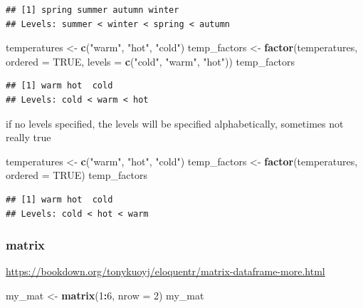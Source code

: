 \documentclass[
]{book}
\newenvironment{Shaded}{\begin{snugshade}}{\end{snugshade}}
\newcommand{\AttributeTok}[1]{\textcolor[rgb]{0.13,0.29,0.53}{#1}}
\newcommand{\ConstantTok}[1]{\textcolor[rgb]{0.56,0.35,0.01}{#1}}
\newcommand{\DecValTok}[1]{\textcolor[rgb]{0.00,0.00,0.81}{#1}}
\newcommand{\FunctionTok}[1]{\textcolor[rgb]{0.13,0.29,0.53}{\textbf{#1}}}
\newcommand{\NormalTok}[1]{#1}
\newcommand{\OtherTok}[1]{\textcolor[rgb]{0.56,0.35,0.01}{#1}}
\newcommand{\SpecialCharTok}[1]{\textcolor[rgb]{0.81,0.36,0.00}{\textbf{#1}}}
\newcommand{\StringTok}[1]{\textcolor[rgb]{0.31,0.60,0.02}{#1}}
\theoremstyle{definition}
\theoremstyle{definition}
\theoremstyle{definition}
\theoremstyle{definition}
\theoremstyle{remark}
\begin{document}
\begin{verbatim}
## [1] spring summer autumn winter
## Levels: summer < winter < spring < autumn
\end{verbatim}

\begin{Shaded}
\begin{Highlighting}[]
\NormalTok{temperatures }\OtherTok{\textless{}{-}} \FunctionTok{c}\NormalTok{(}\StringTok{"warm"}\NormalTok{, }\StringTok{"hot"}\NormalTok{, }\StringTok{"cold"}\NormalTok{)}
\NormalTok{temp\_factors }\OtherTok{\textless{}{-}} \FunctionTok{factor}\NormalTok{(temperatures, }\AttributeTok{ordered =} \ConstantTok{TRUE}\NormalTok{, }\AttributeTok{levels =} \FunctionTok{c}\NormalTok{(}\StringTok{"cold"}\NormalTok{, }\StringTok{"warm"}\NormalTok{, }\StringTok{"hot"}\NormalTok{))}
\NormalTok{temp\_factors}
\end{Highlighting}
\end{Shaded}

\begin{verbatim}
## [1] warm hot  cold
## Levels: cold < warm < hot
\end{verbatim}

if no levels specified, the levels will be specified alphabetically, sometimes not really true

\begin{Shaded}
\begin{Highlighting}[]
\NormalTok{temperatures }\OtherTok{\textless{}{-}} \FunctionTok{c}\NormalTok{(}\StringTok{"warm"}\NormalTok{, }\StringTok{"hot"}\NormalTok{, }\StringTok{"cold"}\NormalTok{)}
\NormalTok{temp\_factors }\OtherTok{\textless{}{-}} \FunctionTok{factor}\NormalTok{(temperatures, }\AttributeTok{ordered =} \ConstantTok{TRUE}\NormalTok{)}
\NormalTok{temp\_factors}
\end{Highlighting}
\end{Shaded}

\begin{verbatim}
## [1] warm hot  cold
## Levels: cold < hot < warm
\end{verbatim}

\hypertarget{matrix}{%
\subsubsection{matrix}\label{matrix}}

\url{https://bookdown.org/tonykuoyj/eloquentr/matrix-dataframe-more.html}

\begin{Shaded}
\begin{Highlighting}[]
\NormalTok{my\_mat }\OtherTok{\textless{}{-}} \FunctionTok{matrix}\NormalTok{(}\DecValTok{1}\SpecialCharTok{:}\DecValTok{6}\NormalTok{, }\AttributeTok{nrow =} \DecValTok{2}\NormalTok{)}
\NormalTok{my\_mat}
\end{Highlighting}
\end{Shaded}
\end{document}
